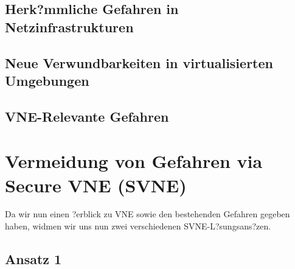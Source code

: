 \documentclass{lni}
\begin{document}
\subsection{Herk?mmliche Gefahren in Netzinfrastrukturen}
\label{subsec:gefahren_allg}



\subsection{Neue Verwundbarkeiten in virtualisierten Umgebungen}
\label{subsec:gefahren_virt}



\subsection{VNE-Relevante Gefahren}
\label{subsec:gefahren_vnerelevant}	


\section{Vermeidung von Gefahren via Secure VNE (SVNE)}
\label{sec:svne}
Da wir nun einen ?erblick zu VNE sowie den bestehenden Gefahren gegeben haben, widmen wir uns nun zwei verschiedenen SVNE-L?sungsans?zen.

\subsection{Ansatz 1}
\end{document}
